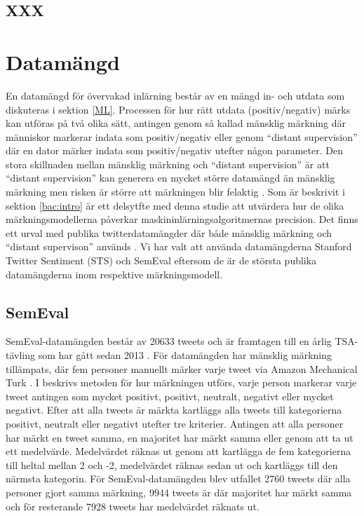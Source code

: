 \documentclass{kaumasters} %
\begin{document}
\subsection{XXX}

\section{Datamängd} \label{DS}
En datamängd för övervakad inlärning består av en mängd in- och utdata som diskuteras i sektion \ref{ML}. Processen för hur rätt utdata (positiv/negativ) märks kan utföras på två olika sätt, antingen genom så kallad mänsklig märkning där människor markerar indata som positiv/negativ eller genom “distant supervision” där en dator märker indata som positiv/negativ utefter någon parameter. Den stora skillnaden mellan mänsklig märkning och “distant supervision” är att “distant supervision” kan generera en mycket större datamängd än mänsklig märkning men risken är större att märkningen blir felaktig \cite{TSAsurvey}. 
Som är beskrivit i sektion \ref{bac:intro} är ett delsytfte med denna studie att utvärdera hur de olika märkningsmodellerna påverkar maskininlärningsalgoritmernas precision. Det finns ett urval med publika twitterdatamängder där både mänsklig märkning och “distant supervison” används \cite{TSAsurvey}. Vi har valt att använda datamängderna Stanford Twitter Sentiment (STS) \cite{sts:001} och SemEval \cite{SemEval:001} eftersom de är de största publika datamängderna inom respektive märkningsmodell.

\subsection{SemEval} \label{DSse}
SemEval-datamängden består av 20633 tweets och är framtagen till en årlig TSA-tävling som har gått sedan 2013 \cite{SemEval:002}. 
För datamängden har mänsklig märkning tillämpats, där fem personer manuellt märker varje tweet via Amazon Mechanical Turk \cite{SemEval:003}.
I \cite{SemEval:004} beskrivs metoden för hur märkningen utförs, varje person markerar varje tweet antingen som mycket positivt, positivt, neutralt, negativt eller mycket negativt. Efter att alla tweets är märkta kartläggs alla tweets till kategorierna positivt, neutralt eller negativt utefter tre kriterier. Antingen att alla personer har märkt en tweet samma, en majoritet har märkt samma eller genom att ta ut ett medelvärde. Medelvärdet räknas ut genom att kartlägga de fem kategorierna till heltal mellan 2 och -2, medelvärdet räknas sedan ut och kartläggs till den närmsta kategorin. För SemEval-datamängden blev utfallet 2760 tweets där alla personer gjort samma märkning, 9944 tweets är där majoritet har märkt samma och för resterande 7928 tweets har medelvärdet räknats ut. 
\end{document}
